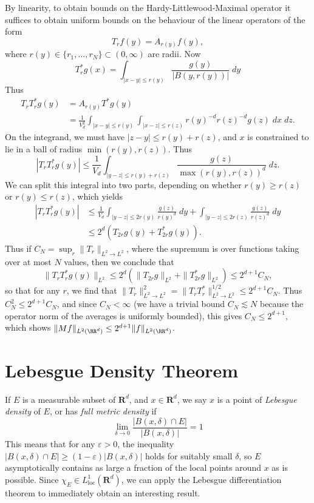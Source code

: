 By linearity, to obtain bounds on the Hardy-Littlewood-Maximal operator it suffices to obtain uniform bounds on the behaviour of the linear operators of the form
%
\[ T_r f(y) = A_{r(y)} f(y), \]
%
where $r(y) \in \{ r_1, \dots, r_N \} \subset (0,\infty)$ are radii. Now
%
\[ T^*_r g(x) = \int_{|x - y| \leq r(y)} \frac{g(y)}{|B(y,r(y))|}\; dy \]
%
Thus
%
\begin{align*}
    T_r T_r^* g(y) &= A_{r(y)} T^* g(y)\\
    &= \frac{1}{V_d^2} \int_{|x - y| \leq r(y)} \int_{|x - z| \leq r(z)} r(y)^{-d} r(z)^{-d} g(z)\; dx\; dz.
\end{align*}
%
On the integrand, we must have $|z - y| \leq r(y) + r(z)$, and $x$ is constrained to lie in a ball of radius $\min(r(y), r(z))$. Thus
%
\[ |T_rT_r^* g(y)| \leq \frac{1}{V_d} \int_{|y - z| \leq r(y) + r(z)} \frac{g(z)}{\max(r(y), r(z))^d}\; dz. \]
%
We can split this integral into two parts, depending on whether $r(y) \geq r(z)$ or $r(y) \leq r(z)$, which yields
%
\begin{align*}
    |T_rT_r^* g(y)| &\leq \frac{1}{V_d} \int_{|y - z| \leq 2r(y)} \frac{g(z)}{r(y)^d}\; dy + \int_{|y - z| \leq 2r(z)} \frac{g(z)}{r(z)^d}\; dy\\
    &\leq 2^d( T_{2r} g(y) + T^*_{2r} g(y) ).
\end{align*}
%
Thus if $C_N = \sup_r \| T_r \|_{L^2 \to L^2}$, where the supremum is over functions taking over at most $N$ values, then we conclude that
%
\[ \| T_r T_r^* g(y) \|_{L^2} \leq 2^d( \| T_{2r} g \|_{L^2} + \| T^*_{2r} g \|_{L^2} ) \leq 2^{d+1} C_N, \]
%
so that for any $r$, we find that $\| T_r \|_{L^2 \to L^2}^2 = \| T_r T_r^* \|_{L^2 \to L^2}^{1/2} \leq 2^{d+1} C_N$. Thus $C_N^2 \leq 2^{d+1} C_N$, and since $C_N < \infty$ (we have a trivial bound $C_N \lesssim N$ because the operator norm of the averages is uniformly bounded), this gives $C_N \leq 2^{d+1}$, which shows $\| Mf \|_{L^2(\RR^d)} \leq 2^{d+1} \| f \|_{L^2(\RR^d)}$.

\section{Lebesgue Density Theorem}

If $E$ is a measurable subset of $\mathbf{R}^d$, and $x \in \mathbf{R}^d$, we say $x$ is a point of \emph{Lebesgue density} of $E$, or has \emph{full metric density} if
%
\[ \lim_{\delta \to 0} \frac{|B(x,\delta) \cap E|}{|B(x,\delta)|} = 1 \]
%
This means that for any $\varepsilon > 0$, the inequality $|B(x,\delta) \cap E| \geq (1 - \varepsilon) |B(x,\delta)|$ holds for suitably small $\delta$, so $E$ asymptotically contains as large a fraction of the local points around $x$ as is possible. Since $\chi_E \in L^1_{\text{loc}}(\mathbf{R}^d)$, we can apply the Lebesgue differentiation theorem to immediately obtain an interesting result.

